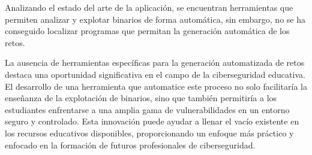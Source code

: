 Analizando el estado del arte de la aplicación, se encuentran herramientas que permiten analizar y explotar binarios de forma automática, sin embargo, no se ha conseguido localizar programas que permitan la generación automática de los retos.

La ausencia de herramientas específicas para la generación automatizada de retos destaca una oportunidad significativa en el campo de la ciberseguridad educativa. El desarrollo de una herramienta que automatice este proceso no solo facilitaría la enseñanza de la explotación de binarios, sino que también permitiría a los estudiantes enfrentarse a una amplia gama de vulnerabilidades en un entorno seguro y controlado. Esta innovación puede ayudar a llenar el vacío existente en los recursos educativos disponibles, proporcionando un enfoque más práctico y enfocado en la formación de futuros profesionales de ciberseguridad.
